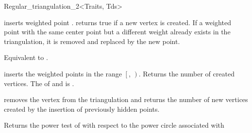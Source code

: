 \begin{ccClassTemplate}{Regular_triangulation_2<Traits, Tds>}

{inserts  weighted point .
returns true if a new vertex is created. 
If a weighted point with the same center point but a 
different weight already exists in the triangulation, 
it is removed and replaced by the new point.
}


{Equivalent to .}

{inserts the weighted points in the range
 $\left[\right.$, $\left.\right)$.
 Returns the number of created vertices.
 \ccPrecond The  of  and 
 is .}

{removes the vertex from the triangulation and
returns the number of new vertices created by the insertion of previously
hidden points.}








\ccThreeToTwo

{Returns the power test of   with respect to the 
power circle  associated with }




\end{ccClassTemplate}
